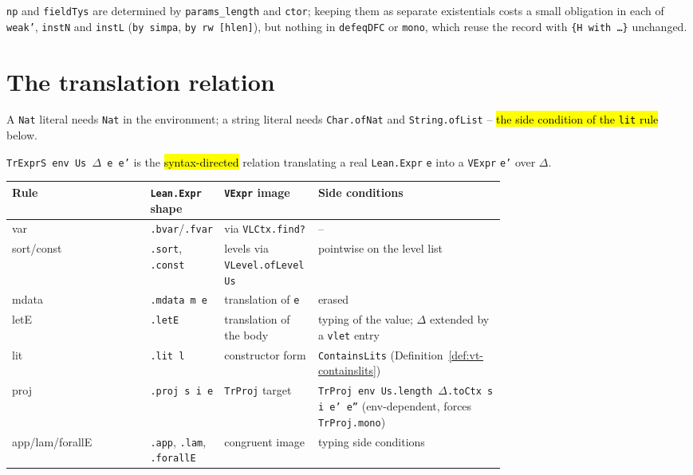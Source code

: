 \begin{remark}
 \texttt{np} and \texttt{fieldTys} are determined by \texttt{params\_length} and \texttt{ctor}; keeping them as separate existentials costs a small obligation in each of \texttt{weak'}, \texttt{instN} and \texttt{instL} (\texttt{by simpa}, \texttt{by rw [hlen]}), but nothing in \texttt{defeqDFC} or \texttt{mono}, which reuse the record with \texttt{\{H with \ldots\}} unchanged.
\end{remark}

\section{The translation relation}

\begin{definition}
\label{def:vt-containslits}
\leanok
{} A \texttt{Nat} literal needs \texttt{Nat} in the environment; a string literal needs \texttt{Char.ofNat} and \texttt{String.ofList} -- \hl{the side condition of the \texttt{lit} rule} below.
\end{definition}

\begin{definition}
\label{ind:trexprs}
\leanok
{}
 

 \texttt{TrExprS env Us $\Delta$ e e'} is the \hl{syntax-directed} relation translating a real \texttt{Lean.Expr} \texttt{e} into a \texttt{VExpr} \texttt{e'} over $\Delta$.
\par\smallskip\noindent
\begin{tabular}{lp{0.15\linewidth}p{0.19\linewidth}p{0.38\linewidth}}
\toprule
Rule & \texttt{Lean.Expr} shape & \texttt{VExpr} image & Side conditions \\
\midrule
var & \texttt{.bvar}/\texttt{.fvar} & via \texttt{VLCtx.find?} & -- \\
sort/const & \texttt{.sort}, \texttt{.const} & levels via \texttt{VLevel.ofLevel Us} & pointwise on the level list \\
mdata & \texttt{.mdata m e} & translation of \texttt{e} & erased \\
letE & \texttt{.letE} & translation of the body & typing of the value; $\Delta$ extended by a \texttt{vlet} entry \\
lit & \texttt{.lit l} & constructor form & \texttt{ContainsLits} (Definition~\ref{def:vt-containslits}) \\
proj & \texttt{.proj s i e} & \texttt{TrProj} target & \texttt{TrProj env Us.length $\Delta$.toCtx s i e' e''} (env-dependent, forces \texttt{TrProj.mono}) \\
app/lam/forallE & \texttt{.app}, \texttt{.lam}, \texttt{.forallE} & congruent image & typing side conditions \\
\bottomrule
\end{tabular}\par\smallskip
\end{definition}

